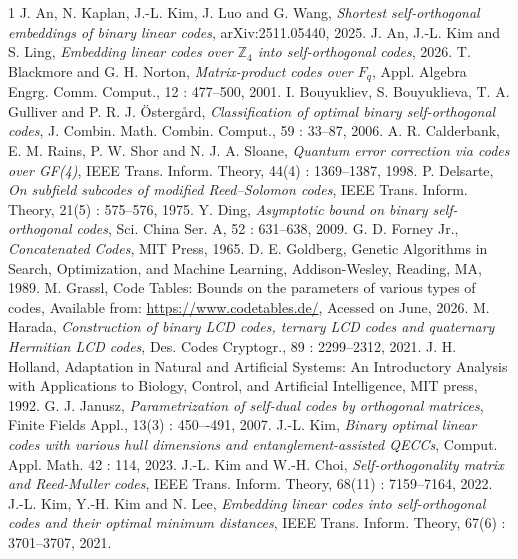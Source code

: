 \documentclass{article}
\begin{document}
\begin{thebibliography}{1}
J. An, N. Kaplan, J.-L. Kim, J. Luo and G. Wang,
\emph{Shortest self-orthogonal embeddings of binary linear codes},
arXiv:2511.05440, 2025.
J. An, J.-L. Kim and S. Ling,
\emph{Embedding linear codes over $\mathbb{Z}_4$ into self-orthogonal codes}, 2026.
T. Blackmore and G. H. Norton,
\emph{Matrix-product codes over $F_q$},
Appl. Algebra Engrg. Comm. Comput.,
12 : 477--500, 2001.
I. Bouyukliev, S. Bouyuklieva, T. A. Gulliver and P. R. J. {\"O}sterg{\aa}rd,
\emph{Classification of optimal binary self-orthogonal codes},
J. Combin. Math. Combin. Comput.,
59 : 33--87, 2006.
A. R. Calderbank, E. M. Rains, P. W. Shor and N. J. A. Sloane,
\emph{Quantum error correction via codes over {GF}(4)},
IEEE Trans. Inform. Theory,
44(4) : 1369--1387, 1998.
P. Delsarte,
\emph{On subfield subcodes of modified Reed–Solomon codes},
IEEE Trans. Inform. Theory,
21(5) : 575--576, 1975.
Y. Ding,
\emph{Asymptotic bound on binary self-orthogonal codes},
Sci. China Ser. A,
52 : 631--638, 2009.
G. D. Forney Jr.,
\emph{Concatenated Codes},
MIT Press, 1965.
D. E. Goldberg,
Genetic Algorithms in Search, Optimization, and Machine Learning,
Addison-Wesley, Reading, MA, 1989.
M. Grassl,
Code Tables: Bounds on the parameters of various types of codes,
Available from: \url{https://www.codetables.de/},
Acessed on June, 2026.
M. Harada,
\emph{Construction of binary LCD codes, ternary LCD codes and quaternary Hermitian LCD codes},
Des. Codes Cryptogr.,
89 : 2299--2312, 2021.
J. H. Holland,
Adaptation in Natural and Artificial Systems: An Introductory Analysis with Applications to Biology, Control, and Artificial Intelligence,
MIT press, 1992.
G. J. Janusz,
\emph{Parametrization of self-dual codes by orthogonal matrices},
Finite Fields Appl.,
13(3) : 450–-491, 2007.
J.-L. Kim,
\emph{Binary optimal linear codes with various hull dimensions and entanglement-assisted QECCs},
Comput. Appl. Math.
42 : 114, 2023.
J.-L. Kim and W.-H. Choi,
\emph{Self-orthogonality matrix and Reed-Muller codes},
IEEE Trans. Inform. Theory,
68(11) : 7159--7164, 2022.
J.-L. Kim, Y.-H. Kim and N. Lee,
\emph{Embedding linear codes into self-orthogonal codes and their optimal minimum distances},
IEEE Trans. Inform. Theory,
67(6) : 3701--3707, 2021.

\end{thebibliography}
\end{document}
